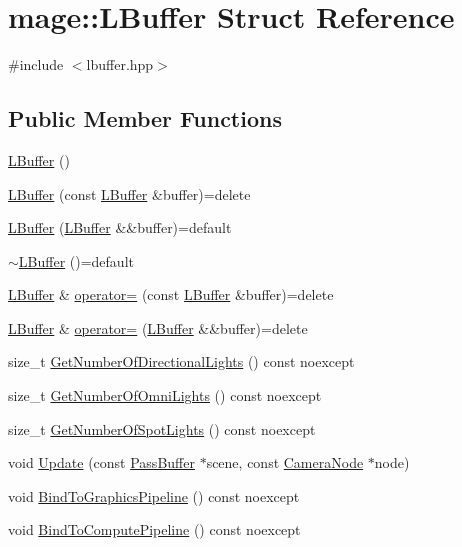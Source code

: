 \hypertarget{structmage_1_1_l_buffer}{}\section{mage\+:\+:L\+Buffer Struct Reference}
\label{structmage_1_1_l_buffer}


{\ttfamily \#include $<$lbuffer.\+hpp$>$}

\subsection*{Public Member Functions}
\begin{DoxyCompactItemize}
\item 
\hyperlink{structmage_1_1_l_buffer_ae77361126bdfd7ea54d51f8b6bb73e16}{L\+Buffer} ()
\item 
\hyperlink{structmage_1_1_l_buffer_a2f50ec83e9f27df697a1e2e0dd6aae12}{L\+Buffer} (const \hyperlink{structmage_1_1_l_buffer}{L\+Buffer} \&buffer)=delete
\item 
\hyperlink{structmage_1_1_l_buffer_acb82bdf195e40ec1f6626422ca28ebae}{L\+Buffer} (\hyperlink{structmage_1_1_l_buffer}{L\+Buffer} \&\&buffer)=default
\item 
\hyperlink{structmage_1_1_l_buffer_acbd32ee8f1c454ba6aff45ad7cdcb818}{$\sim$\+L\+Buffer} ()=default
\item 
\hyperlink{structmage_1_1_l_buffer}{L\+Buffer} \& \hyperlink{structmage_1_1_l_buffer_ae2bbc95b108adcbfb52ac7165bbb7bcf}{operator=} (const \hyperlink{structmage_1_1_l_buffer}{L\+Buffer} \&buffer)=delete
\item 
\hyperlink{structmage_1_1_l_buffer}{L\+Buffer} \& \hyperlink{structmage_1_1_l_buffer_a215de33360d297c0c2793b238ee82131}{operator=} (\hyperlink{structmage_1_1_l_buffer}{L\+Buffer} \&\&buffer)=delete
\item 
size\+\_\+t \hyperlink{structmage_1_1_l_buffer_a6a32b15f7c55b21bb09fc79457a82392}{Get\+Number\+Of\+Directional\+Lights} () const noexcept
\item 
size\+\_\+t \hyperlink{structmage_1_1_l_buffer_a491fdf6d191796a371c6456094158eb9}{Get\+Number\+Of\+Omni\+Lights} () const noexcept
\item 
size\+\_\+t \hyperlink{structmage_1_1_l_buffer_af4b83d179c5578ff84b06704ce1b0359}{Get\+Number\+Of\+Spot\+Lights} () const noexcept
\item 
void \hyperlink{structmage_1_1_l_buffer_a5584d77b6d99bfc0dfe7ac57734a105b}{Update} (const \hyperlink{structmage_1_1_pass_buffer}{Pass\+Buffer} $\ast$scene, const \hyperlink{classmage_1_1_camera_node}{Camera\+Node} $\ast$node)
\item 
void \hyperlink{structmage_1_1_l_buffer_a1c732d078b14eb147662d4caee134cdb}{Bind\+To\+Graphics\+Pipeline} () const noexcept
\item 
void \hyperlink{structmage_1_1_l_buffer_abea057cfe64c13211a02cc2d080efe8e}{Bind\+To\+Compute\+Pipeline} () const noexcept
\end{DoxyCompactItemize}
